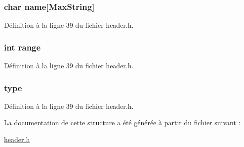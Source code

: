 \hypertarget{structt__skill_ab27f28c5ead39031421706ddbbd1edea}{
\subsubsection[{name}]{\setlength{\rightskip}{0pt plus 5cm}char name\mbox{[}{\bf Max\-String}\mbox{]}}}\label{structt__skill_ab27f28c5ead39031421706ddbbd1edea}


Définition à la ligne 39 du fichier header.\-h.

\hypertarget{structt__skill_a037e8e370380046bec287bdc96942091}{
\subsubsection[{range}]{\setlength{\rightskip}{0pt plus 5cm}int range}}\label{structt__skill_a037e8e370380046bec287bdc96942091}


Définition à la ligne 39 du fichier header.\-h.

\hypertarget{structt__skill_ac00edc3c188c78c47878a357ecff2954}{
\subsubsection[{type}]{ type}}\label{structt__skill_ac00edc3c188c78c47878a357ecff2954}


Définition à la ligne 39 du fichier header.\-h.



La documentation de cette structure a été générée à partir du fichier suivant \-:\begin{DoxyCompactItemize}
\item 
\hyperlink{header_8h}{header.\-h}\end{DoxyCompactItemize}

